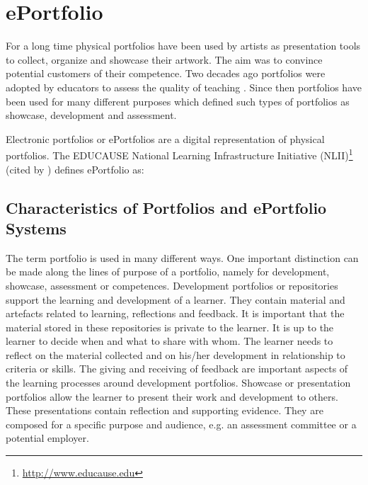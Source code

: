 \section{ePortfolio}
For a long time physical portfolios have been used by artists as presentation
tools to collect, organize and showcase their artwork. The aim was to convince
potential customers of their competence. Two decades ago portfolios were adopted
by educators to assess the quality of teaching \citep{VanTartwijkJ.2004}. Since
then portfolios have been used for many different purposes which defined such
types of portfolios as showcase, development and assessment.

Electronic portfolios or ePortfolios are a digital representation of physical
portfolios. The EDUCAUSE National Learning Infrastructure Initiative
(NLII)\footnote{\url{http://www.educause.edu}} (cited by
\citealp{IMSGlobalLearningConsortium2005}) defines ePortfolio as:


\subsection{Characteristics of Portfolios and ePortfolio Systems}
The term portfolio is used in many different ways. One important distinction can
be made along the lines of purpose of a portfolio, namely for development,
showcase, assessment or competences. Development portfolios or repositories
support the learning and development of a learner. They contain material and
artefacts related to learning, reflections and feedback. It is important that
the material stored in these repositories is private to the learner. It is up to
the learner to decide when and what to share with whom. The learner needs to
reflect on the material collected and on his/her development in relationship to
criteria or skills. The giving and receiving of feedback are important aspects
of the learning processes around development portfolios. Showcase or
presentation portfolios allow the learner to present their work and development
to others. These presentations contain reflection and supporting evidence. They
are composed for a specific purpose and audience, e.g. an assessment committee
or a potential employer.

